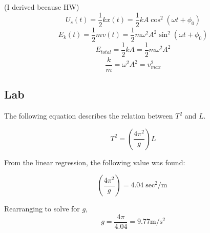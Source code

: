 (I derived because HW)
$$U_s(t) = \frac{1}{2}kx(t) = \frac{1}{2}k A \cos^2(\omega t + \phi_0)$$
$$E_k(t) = \frac{1}{2}mv(t) = \frac{1}{2}m \omega^2 A^2 \sin^2(\omega t + \phi_0)$$
$$E_{total} = \frac{1}{2} kA = \frac{1}{2} m \omega^2 A^2$$
$$\frac{k}{m} = \omega^2 A^2 = v_{max}^2$$

\subsection{Lab}

The following equation describes the relation between $T^2$ and $L$.

$$T^2 = \left(\frac{4\pi^2}{g}\right)L$$

From the linear regression, the following value was found:

$$\left(\frac{4\pi^2}{g}\right) = 4.04 \si{\sec^2\per\m}$$

Rearranging to solve for $g$,
$$g = \frac{4\pi}{4.04} = 9.77 \si{\m\per\s^2}$$